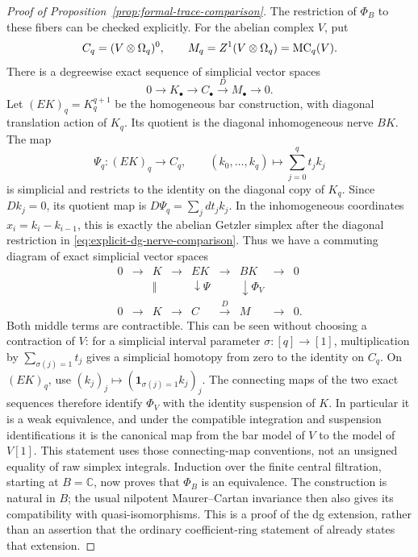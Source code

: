 \begin{proof}[Proof of Proposition~\ref{prop:formal-trace-comparison}]
The restriction of \(\Phi_B\) to these fibers can be checked explicitly.
For the abelian complex \(V\), put
\[
 C_q=(V\otimes\Omega_q)^0,
 \qquad M_q=Z^1(V\otimes\Omega_q)=\operatorname{MC}_q(V).
\]
There is a degreewise exact sequence of simplicial vector spaces
\[
                    0\longrightarrow K_\bullet
                    \longrightarrow C_\bullet
                    \xrightarrow{D}M_\bullet\longrightarrow0.
\]
Let \((EK)_q=K_q^{q+1}\) be the homogeneous bar construction, with
diagonal translation action of \(K_q\).  Its quotient is the diagonal
inhomogeneous nerve \(BK\).  The map
\[
 \Psi_q:(EK)_q\longrightarrow C_q,
 \qquad
       (k_0,\ldots,k_q)\longmapsto\sum_{j=0}^q t_j k_j
\]
is simplicial and restricts to the identity on the diagonal copy of
\(K_q\).  Since \(Dk_j=0\), its quotient map is
\(D\Psi_q=\sum_jdt_j k_j\).  In the inhomogeneous coordinates
\(x_i=k_i-k_{i-1}\), this is exactly the abelian Getzler simplex
after the diagonal restriction in
\eqref{eq:explicit-dg-nerve-comparison}.  Thus we have a commuting
diagram of exact simplicial vector spaces
\[
\begin{array}{ccccccccc}
0&\longrightarrow&K&\longrightarrow&EK&\longrightarrow&BK&\longrightarrow&0\\
 &&\Vert&&\downarrow\Psi&&\downarrow\Phi_V\\
0&\longrightarrow&K&\longrightarrow&C&\xrightarrow{D}&M&\longrightarrow&0.
\end{array}
\]
Both middle terms are contractible.  This can be seen without choosing
a contraction of \(V\): for a simplicial interval parameter
\(\sigma:[q]\to[1]\), multiplication by
\(\sum_{\sigma(j)=1}t_j\) gives a simplicial homotopy from zero to
the identity on \(C_q\).  On \((EK)_q\), use
\((k_j)_j\mapsto(\mathbf1_{\sigma(j)=1}k_j)_j\).
The connecting maps of the two exact sequences therefore identify
\(\Phi_V\) with the identity suspension of \(K\).  In particular it
is a weak equivalence, and under the compatible integration and
suspension identifications it is the canonical map from the bar model
of \(V\) to the model of \(V[1]\).  This statement uses those
connecting-map conventions, not an unsigned equality of raw simplex
integrals.  Induction over the finite central filtration, starting at
\(B=\mathbb C\), now proves that \(\Phi_B\) is an equivalence.
The construction is natural in \(B\); the usual nilpotent
Maurer--Cartan invariance then also gives its compatibility with
quasi-isomorphisms.  This is a proof of the dg extension, rather than
an assertion that the ordinary coefficient-ring statement of
\cite[Proposition~4.9]{Getzler2009} already states that extension.


\end{proof}
